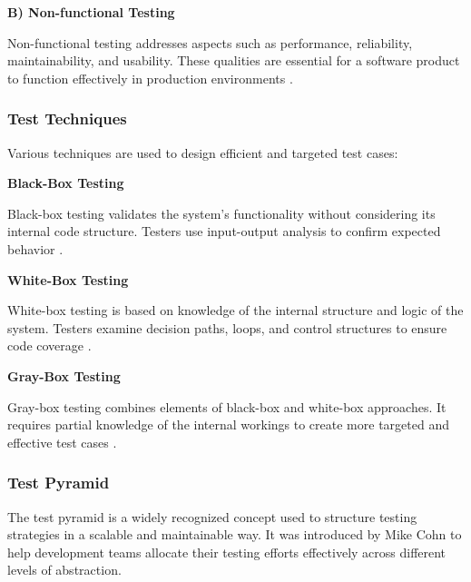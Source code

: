 \vspace{1em}
\textbf{B) Non-functional Testing}

\vspace{0.4em}
Non-functional testing addresses aspects such as performance, reliability, maintainability, and usability. These qualities are essential for a software product to function effectively in production environments \cite{kaner1999testing}.

\vspace{0.4em}
\subsubsection{Test Techniques}

Various techniques are used to design efficient and targeted test cases:

\vspace{1em}
\textbf{Black-Box Testing}

\vspace{0.4em}
Black-box testing validates the system's functionality without considering its internal code structure. Testers use input-output analysis to confirm expected behavior \cite{myers2011art}.

\vspace{1em}
\textbf{White-Box Testing}

\vspace{0.4em}
White-box testing is based on knowledge of the internal structure and logic of the system. Testers examine decision paths, loops, and control structures to ensure code coverage \cite{burnstein2003practical}.

\vspace{1em}
\textbf{Gray-Box Testing}

\vspace{0.4em}
Gray-box testing combines elements of black-box and white-box approaches. It requires partial knowledge of the internal workings to create more targeted and effective test cases \cite{ammann2016introduction}.

\subsubsection{Test Pyramid}

The test pyramid is a widely recognized concept used to structure testing strategies in a scalable and maintainable way. It was introduced by Mike Cohn \cite{cohn2009succeeding} to help development teams allocate their testing efforts effectively across different levels of abstraction.

